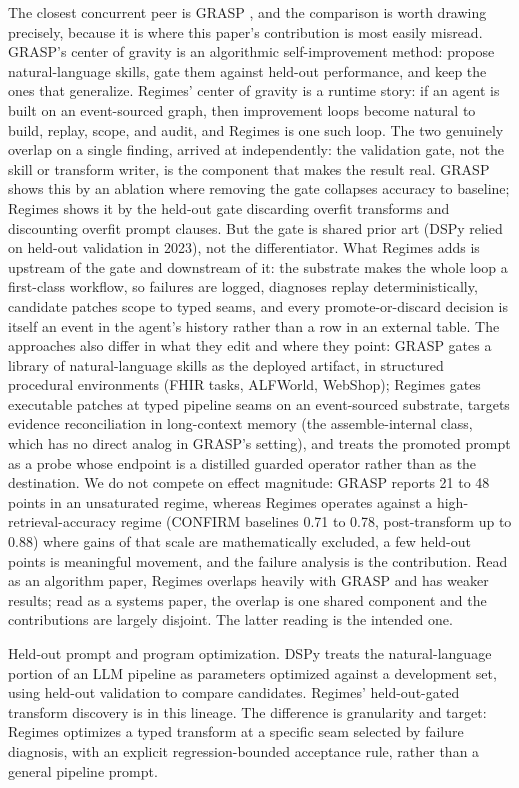 The closest concurrent peer is GRASP \citep{moll2026grasp}, and the comparison is worth drawing precisely, because it is where this paper's contribution is most easily misread. GRASP's center of gravity is an algorithmic self-improvement method: propose natural-language skills, gate them against held-out performance, and keep the ones that generalize. Regimes' center of gravity is a runtime story: if an agent is built on an event-sourced graph, then improvement loops become natural to build, replay, scope, and audit, and Regimes is one such loop. The two genuinely overlap on a single finding, arrived at independently: the validation gate, not the skill or transform writer, is the component that makes the result real. GRASP shows this by an ablation where removing the gate collapses accuracy to baseline; Regimes shows it by the held-out gate discarding overfit transforms and discounting overfit prompt clauses. But the gate is shared prior art (DSPy relied on held-out validation in 2023), not the differentiator. What Regimes adds is upstream of the gate and downstream of it: the substrate makes the whole loop a first-class workflow, so failures are logged, diagnoses replay deterministically, candidate patches scope to typed seams, and every promote-or-discard decision is itself an event in the agent's history rather than a row in an external table. The approaches also differ in what they edit and where they point: GRASP gates a library of natural-language skills as the deployed artifact, in structured procedural environments (FHIR tasks, ALFWorld, WebShop); Regimes gates executable patches at typed pipeline seams on an event-sourced substrate, targets evidence reconciliation in long-context memory (the assemble-internal class, which has no direct analog in GRASP's setting), and treats the promoted prompt as a probe whose endpoint is a distilled guarded operator rather than as the destination. We do not compete on effect magnitude: GRASP reports 21 to 48 points in an unsaturated regime, whereas Regimes operates against a high-retrieval-accuracy regime (CONFIRM baselines 0.71 to 0.78, post-transform up to 0.88) where gains of that scale are mathematically excluded, a few held-out points is meaningful movement, and the failure analysis is the contribution. Read as an algorithm paper, Regimes overlaps heavily with GRASP and has weaker results; read as a systems paper, the overlap is one shared component and the contributions are largely disjoint. The latter reading is the intended one.

Held-out prompt and program optimization. DSPy \citep{khattab2023dspy} treats the natural-language portion of an LLM pipeline as parameters optimized against a development set, using held-out validation to compare candidates. Regimes' held-out-gated transform discovery is in this lineage. The difference is granularity and target: Regimes optimizes a typed transform at a specific seam selected by failure diagnosis, with an explicit regression-bounded acceptance rule, rather than a general pipeline prompt.

